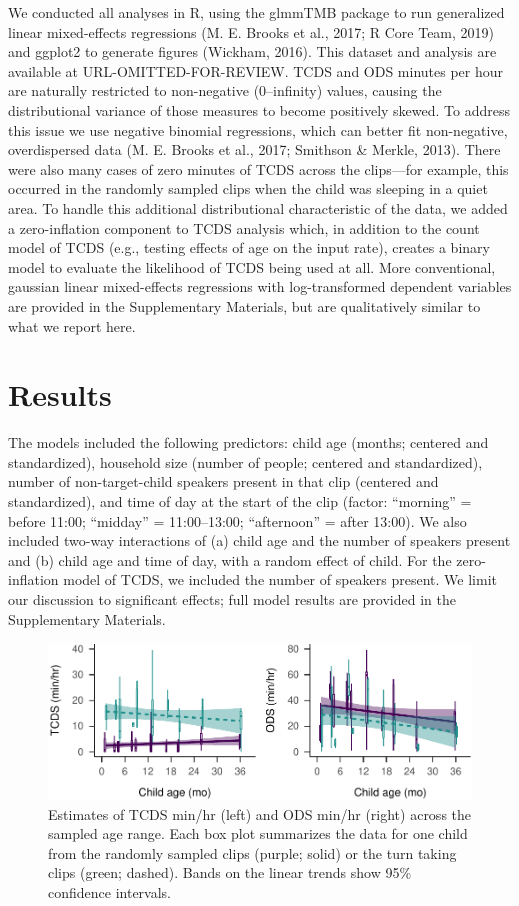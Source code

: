 \documentclass[,man,floatsintext]{apa6}
\begin{document}
We conducted all analyses in R, using the glmmTMB package to run
generalized linear mixed-effects regressions (M. E. Brooks et al., 2017;
R Core Team, 2019) and ggplot2 to generate figures (Wickham, 2016). This
dataset and analysis are available at URL-OMITTED-FOR-REVIEW. TCDS and
ODS minutes per hour are naturally restricted to non-negative
(0--infinity) values, causing the distributional variance of those
measures to become positively skewed. To address this issue we use
negative binomial regressions, which can better fit non-negative,
overdispersed data (M. E. Brooks et al., 2017; Smithson \& Merkle,
2013). There were also many cases of zero minutes of TCDS across the
clips---for example, this occurred in the randomly sampled clips when
the child was sleeping in a quiet area. To handle this additional
distributional characteristic of the data, we added a zero-inflation
component to TCDS analysis which, in addition to the count model of TCDS
(e.g., testing effects of age on the input rate), creates a binary model
to evaluate the likelihood of TCDS being used at all. More conventional,
gaussian linear mixed-effects regressions with log-transformed dependent
variables are provided in the Supplementary Materials, but are
qualitatively similar to what we report here.

\section{Results}\label{results}

The models included the following predictors: child age (months;
centered and standardized), household size (number of people; centered
and standardized), number of non-target-child speakers present in that
clip (centered and standardized), and time of day at the start of the
clip (factor: \enquote{morning} = before 11:00; \enquote{midday} =
11:00--13:00; \enquote{afternoon} = after 13:00). We also included
two-way interactions of (a) child age and the number of speakers present
and (b) child age and time of day, with a random effect of child. For
the zero-inflation model of TCDS, we included the number of speakers
present. We limit our discussion to significant effects; full model
results are provided in the Supplementary Materials.

\begin{figure}
\centering
\includegraphics{Yeli-CLE_files/figure-latex/fig2-1.pdf}
\caption{\label{fig:fig2}Estimates of TCDS min/hr (left) and ODS min/hr
(right) across the sampled age range. Each box plot summarizes the data
for one child from the randomly sampled clips (purple; solid) or the
turn taking clips (green; dashed). Bands on the linear trends show 95\%
confidence intervals.}
\end{figure}
\end{document}
